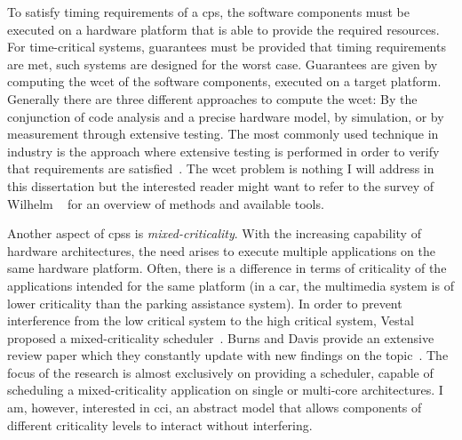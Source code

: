 To satisfy timing requirements of a \gls{cps}, the software components must be executed on a hardware platform that is able to provide the required resources.
For time-critical systems, guarantees must be provided that timing requirements are met, \ie such systems are designed for the worst case.
Guarantees are given by computing the \gls{wcet} of the software components, executed on a target platform.
Generally there are three different approaches to compute the \gls{wcet}:
By the conjunction of code analysis and a precise hardware model, by simulation, or by measurement through extensive testing.
The most commonly used technique in industry is the approach where extensive testing is performed in order to verify that requirements are satisfied~\cite{lee2008}.
The \gls{wcet} problem is nothing I will address in this dissertation but the interested reader might want to refer to the survey of Wilhelm \etal~\cite{wilhelm2008} for an overview of methods and available tools.

Another aspect of \glspl{cps} is \emph{mixed-criticality}.
With the increasing capability of hardware architectures, the need arises to execute multiple applications on the same hardware platform.
Often, there is a difference in terms of criticality of the applications intended for the same platform (\eg in a car, the multimedia system is of lower criticality than the parking assistance system).
In order to prevent interference from the low critical system to the high critical system, Vestal proposed a mixed-criticality scheduler~\cite{vestal2007}.
Burns and Davis provide an extensive review paper which they constantly update with new findings on the topic~\cite{burns2016}.
The focus of the research is almost exclusively on providing a scheduler, capable of scheduling a mixed-criticality application on single or multi-core architectures.
I am, however, interested in \gls{cci}, \ie an abstract model that allows components of different criticality levels to interact without interfering.

